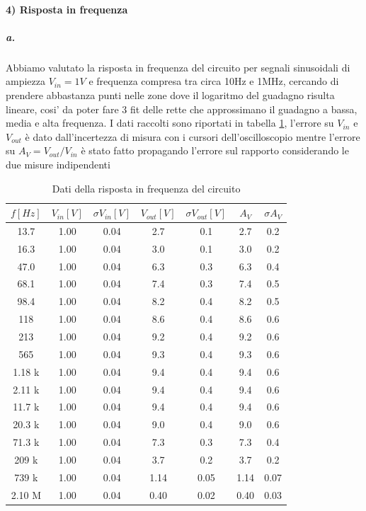 \documentclass[10pt,a4paper]{article}
\begin{document}
\paragraph{4) Risposta in frequenza}
\subparagraph{a.}
Abbiamo valutato la risposta in frequenza del circuito per segnali sinusoidali di ampiezza $V_{in}=1V$ e frequenza compresa tra circa 10Hz e 1MHz, cercando di prendere abbastanza punti nelle zone dove il logaritmo del guadagno risulta lineare, cosi' da poter fare 3 fit delle rette che approssimano il guadagno a bassa, media e alta frequenza. I dati raccolti sono riportati in tabella \ref{tab:frequenza}, l'errore su $V_{in}$ e $V_{out}$ è dato dall'incertezza di misura con i cursori dell'oscilloscopio mentre l'errore su $A_V=V_{out}/V_{in}$ è stato fatto propagando l'errore sul rapporto considerando le due misure indipendenti

    \begin{table}[]
        \centering
        \begin{tabular}{ccccccc}
        \hline
            $f [Hz]$& $V_{in} [V]$& $\sigma V_{in} [V]$& $V_{out} [V]$& $\sigma V_{out} [V]$& $A_V$& $\sigma A_V$\\
            \hline
            13.7& 1.00& 0.04& 2.7& 0.1& 2.7& 0.2\\
            16.3& 1.00& 0.04& 3.0& 0.1& 3.0& 0.2\\
            47.0& 1.00& 0.04& 6.3& 0.3& 6.3& 0.4\\
            68.1& 1.00& 0.04& 7.4& 0.3& 7.4& 0.5\\
            98.4& 1.00& 0.04& 8.2& 0.4& 8.2& 0.5\\
            118& 1.00& 0.04& 8.6& 0.4& 8.6& 0.6\\
            213& 1.00& 0.04& 9.2& 0.4& 9.2& 0.6\\
            565& 1.00& 0.04& 9.3& 0.4& 9.3& 0.6\\
            1.18 k& 1.00& 0.04& 9.4& 0.4& 9.4& 0.6\\
            2.11 k& 1.00& 0.04& 9.4& 0.4& 9.4& 0.6\\
            11.7 k& 1.00& 0.04& 9.4& 0.4& 9.4& 0.6\\
            20.3 k& 1.00& 0.04& 9.0& 0.4& 9.0& 0.6\\
            71.3 k& 1.00& 0.04& 7.3& 0.3& 7.3& 0.4\\
            209 k& 1.00& 0.04& 3.7& 0.2& 3.7& 0.2\\
            739 k& 1.00& 0.04& 1.14& 0.05& 1.14& 0.07\\
            2.10 M& 1.00& 0.04& 0.40& 0.02& 0.40& 0.03\\
        \end{tabular}
        \caption{Dati della risposta in frequenza del circuito}
        \label{tab:frequenza}
    \end{table}
\end{document}

